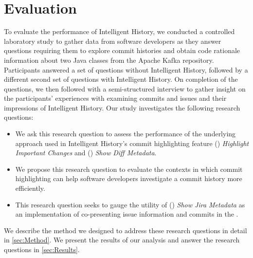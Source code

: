 \chapter{Evaluation}
\label{ch:Evaluation}

To evaluate the performance of Intelligent History, 
we conducted a controlled laboratory study to gather data from software developers as they answer questions
requiring them to explore commit histories and obtain code rationale information 
about two Java classes from the Apache Kafka repository.
Participants answered a set of questions without Intelligent History,
followed by a different second set of questions with Intelligent History.
On completion of the questions, we then followed with a semi-structured interview
to gather insight on the participants' experiences with examining commits and issues
and their impressions of Intelligent History.
Our study investigates the following research questions:

\begin{itemize}[leftmargin=*]
    \item[]  
    We ask this research question to assess the performance of the underlying approach 
    used in Intelligent History's commit highlighting feature () \textit{Highlight Important Changes} 
    and () \textit{Show Diff Metadata}.

    \item[] 
    We propose this research question to evaluate the contexts in which commit highlighting can help software developers
    investigate a commit history more efficiently.

    \item[] 
    This research question seeks to gauge the utility of () \textit{Show Jira Metadata} as
    an implementation of co-presenting issue information and commits in the .
\end{itemize}

We describe the method we designed to address these research questions in detail in \autoref{sec:Method}.
We present the results of our analysis and answer the research questions in \autoref{sec:Results}.

